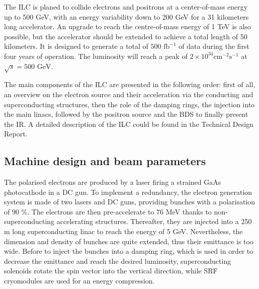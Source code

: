     The \gls{ILC} is planed to collide electrons and positrons at a center-of-mass energy up to 500 GeV, with an energy variability down to 200 GeV for a 31 kilometers long accelerator. 
    An upgrade to reach the centre-of-mass energy of 1 TeV is also possible, but the accelerator should be extended to achieve a total length of 50 kilometers.
    It is designed to generate a total of $500\text{ fb}^{-1}$ of data during the first four years of operation. The luminosity will reach a peak of $2 \times 10^{34}\text{cm}^{-2}\text{s}^{-1}$ at $\sqrt s = 500\text{ GeV}$.


    The main components of the \gls{ILC} are presented in the following order: first of all, an overview on the electron source and their acceleration via the conducting and superconducting structures, then the role of the damping rings, the injection into the main linacs, followed by the positron source and the \gls{BDS} to finally present the \gls{IR}.
    A detailed description of the \gls{ILC} could be found in the Technical Design Report\cite{Appleby2006}.

    \subsection{Machine design and beam parameters}
    \label{subsec:design}

    The polarised electrons are produced by a laser firing a strained GaAs photocathode in a \gls{DC} gun.
    To implement a redundancy, the electron generation system is made of two lasers and \gls{DC} guns, providing bunches with a polarisation of 90 $\%$.
    The electrons are then pre-accelerate to 76 MeV thanks to non-superconducting accelerating structures.
    Thereafter, they are injected into a 250 m long superconducting linac to reach the energy of 5 GeV.
    Nevertheless, the dimension and density of bunches are quite extended, thus their emittance is too wide.
    Before to inject the bunches into a damping ring, which is used in order to decrease the emittance and reach the desired luminosity, superconducting solenoids rotate the spin vector into the vertical direction, while \gls{SRF} cryomodules are used for an energy compression.
 
